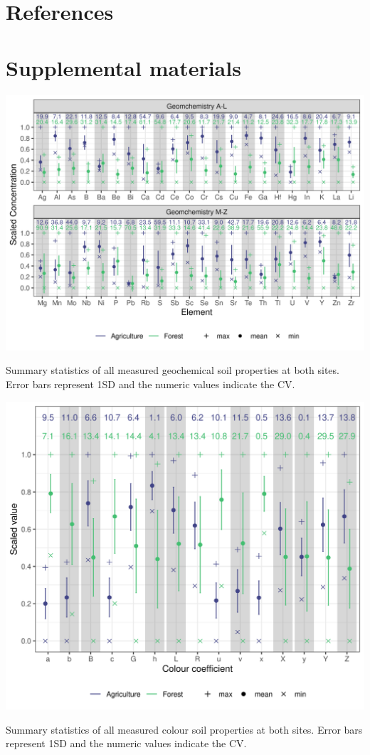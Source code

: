 \documentclass[
  number]{elsarticle}
\begin{document}
\section*{References}\label{references}

\renewcommand{\bibsection}{}


\section*{Supplemental materials}\label{supplemental-materials}

\label{ssuppfig-geo_summary}
\includegraphics[width=1\textwidth,height=\textheight]{images/geo_summary.png}

Summary statistics of all measured geochemical soil properties at both
sites. Error bars represent 1SD and the numeric values indicate the CV.

\label{ssuppfig-colour_summary}
\includegraphics[width=1\textwidth,height=\textheight]{images/colour_summary.png}

Summary statistics of all measured colour soil properties at both sites.
Error bars represent 1SD and the numeric values indicate the CV.
\end{document}
